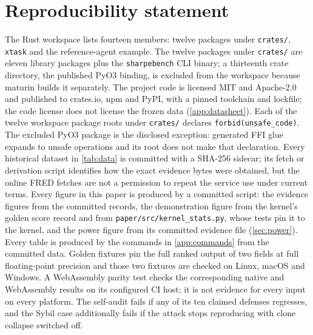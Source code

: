 \section{Reproducibility statement}\label{sec:repro}

The Rust workspace lists fourteen members: twelve packages under \texttt{crates/}, \texttt{xtask} and the reference-agent example. The twelve packages under \texttt{crates/} are eleven library packages plus the \texttt{sharpebench} CLI binary; a thirteenth crate directory, the published PyO3 binding, is excluded from the workspace because maturin builds it separately. The project code is licensed MIT and Apache-2.0 and published to crates.io, npm and PyPI, with a pinned toolchain and lockfile; the code license does not license the frozen data (\cref{app:datasheet}). Each of the twelve workspace package roots under \texttt{crates/} declares \texttt{forbid(unsafe\_code)}. The excluded PyO3 package is the disclosed exception: generated FFI glue expands to unsafe operations and its root does not make that declaration. Every historical dataset in \cref{tab:data} is committed with a SHA-256 sidecar; its fetch or derivation script identifies how the exact evidence bytes were obtained, but the online FRED fetches are not a permission to repeat the service use under current terms. Every figure in this paper is produced by a committed script: the evidence figures from the committed records, the demonstration figure from the kernel's golden score record and from \texttt{paper/src/kernel\_stats.py}, whose tests pin it to the kernel, and the power figure from its committed evidence file (\cref{sec:power}). Every table is produced by the commands in \cref{app:commands} from the committed data. Golden fixtures pin the full ranked output of two fields at full floating-point precision and those two fixtures are checked on Linux, macOS and Windows. A WebAssembly parity test checks the corresponding native and WebAssembly results on its configured CI host; it is not evidence for every input on every platform. The self-audit fails if any of its ten claimed defenses regresses, and the Sybil case additionally fails if the attack stops reproducing with clone collapse switched off.

